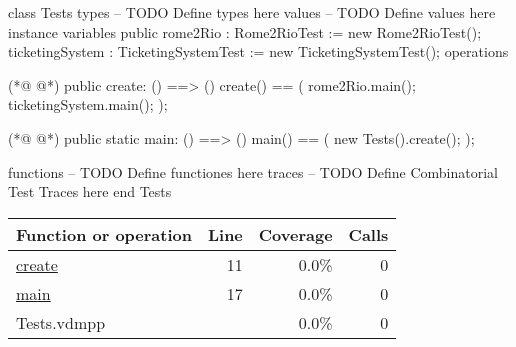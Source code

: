 \begin{vdmpp}[breaklines=true]
class Tests
types
-- TODO Define types here
values
-- TODO Define values here
instance variables
 public rome2Rio : Rome2RioTest := new Rome2RioTest();
 ticketingSystem : TicketingSystemTest := new TicketingSystemTest();
operations

(*@
\label{create:11}
@*)
 public create: () ==> ()
 create() == (
  rome2Rio.main();
  ticketingSystem.main();
 );
 
(*@
\label{main:17}
@*)
 public static main: () ==> ()
    main() == (
      new Tests().create();
   );
 
functions
-- TODO Define functiones here
traces
-- TODO Define Combinatorial Test Traces here
end Tests
\end{vdmpp}
\bigskip
\begin{longtable}{|l|r|r|r|}
\hline
Function or operation & Line & Coverage & Calls \\
\hline
\hline
\hyperref[create:11]{create} & 11&0.0\% & 0 \\
\hline
\hyperref[main:17]{main} & 17&0.0\% & 0 \\
\hline
\hline
Tests.vdmpp & & 0.0\% & 0 \\
\hline
\end{longtable}

